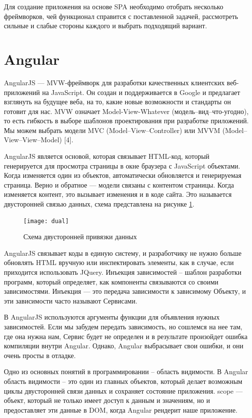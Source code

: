 Для создание приложения на основе SPA необходимо отобрать несколько фреймворков, чей функционал справится с поставленной задачей, рассмотреть сильные и слабые стороны каждого и выбрать подходящий вариант.

\section {Angular}

AngularJS --- MVW-фреймворк для разработки качественных клиентских веб-приложений на JavaScript. Он создан и поддерживается в Google и предлагает взглянуть на будущее веба, на то, какие новые возможности и стандарты он готовит для нас. MVW означает Model-View-Whatever (модель--вид--что-угодно), то есть гибкость в выборе шаблонов проектирования при разработке приложений. Мы можем выбрать модели MVC (Model--View--Controller) или MVVM (Model--View--View--Model) [4].

AngularJS является основой, которая связывает HTML-код, который генерируется для просмотра страницы в окне браузера с JavaScript объектами. Когда изменяется один из объектов, автоматически обновляется и генерируемая страница. Верно и обратное --- модели связаны с контентом страницы. Когда изменяется контент, это вызывает изменения и в коде сайта. Это называется двусторонней связью данных, схема представлена на рисунке \ref{dual}.

\begin{figure}[ht]
\center\texttt{[image: dual]}
\caption{Схема двусторонней привязки данных}\label{dual}
\end{figure}

AngularJS связывает коды в единую систему, и разработчику не нужно больше обновлять HTML вручную или инспектировать элементы, как в случае, если приходится использовать JQuery.
Инъекция зависимостей – шаблон разработки программ, который определяет, как компоненты связываются со своими зависимостями. Инъекция — это передача зависимости к зависимому Объекту, и эти зависимости часто называют Сервисами.

В AngularJS используются аргументы функции для объявления нужных зависимостей. Если мы забудем передать зависимость, но сошлемся на нее там, где она нужна нам, Сервис будет не определен и в результате произойдет ошибка компиляции внутри Angular. Однако, Angular выбрасывает свои ошибки, и они очень просты в отладке.

Одно из основных понятий в программировании – область видимости. В Angular область видимости – это один из главных объектов, который делает возможным циклы двусторонней связи данных и сохраняет состояние приложения. \textdollar scope --- объект, который не только имеет доступ к данным и значениям, но и предоставляет эти данные в DOM, когда Angular рендерит наше приложение.

